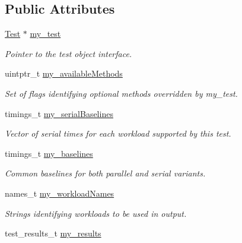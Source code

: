 \subsection*{Public Attributes}
\begin{DoxyCompactItemize}
\item 
\hypertarget{structPerf_1_1internal_1_1TestResults_a8f1159d3b6e5894a402b8e0422ed1144}{}\hyperlink{classPerf_1_1Test}{Test} $\ast$ \hyperlink{structPerf_1_1internal_1_1TestResults_a8f1159d3b6e5894a402b8e0422ed1144}{my\+\_\+test}\label{structPerf_1_1internal_1_1TestResults_a8f1159d3b6e5894a402b8e0422ed1144}

\begin{DoxyCompactList}\small\item\em Pointer to the test object interface. \end{DoxyCompactList}\item 
uintptr\+\_\+t \hyperlink{structPerf_1_1internal_1_1TestResults_a8a6b70b4429aa994c86eb7a78b5ade9d}{my\+\_\+available\+Methods}
\begin{DoxyCompactList}\small\item\em Set of flags identifying optional methods overridden by my\+\_\+test. \end{DoxyCompactList}\item 
timings\+\_\+t \hyperlink{structPerf_1_1internal_1_1TestResults_a32c0056ff414a92af0bf887c7dd47fc4}{my\+\_\+serial\+Baselines}
\begin{DoxyCompactList}\small\item\em Vector of serial times for each workload supported by this test. \end{DoxyCompactList}\item 
timings\+\_\+t \hyperlink{structPerf_1_1internal_1_1TestResults_a7d42b5547c38daedbdf14aa51ce3e2fc}{my\+\_\+baselines}
\begin{DoxyCompactList}\small\item\em Common baselines for both parallel and serial variants. \end{DoxyCompactList}\item 
\hypertarget{structPerf_1_1internal_1_1TestResults_a2d272284bd1c20bbb23e8fb55ee9fad6}{}names\+\_\+t \hyperlink{structPerf_1_1internal_1_1TestResults_a2d272284bd1c20bbb23e8fb55ee9fad6}{my\+\_\+workload\+Names}\label{structPerf_1_1internal_1_1TestResults_a2d272284bd1c20bbb23e8fb55ee9fad6}

\begin{DoxyCompactList}\small\item\em Strings identifying workloads to be used in output. \end{DoxyCompactList}\item 
\hypertarget{structPerf_1_1internal_1_1TestResults_a17a9f028825a7020406f37067c41bc2c}{}test\+\_\+results\+\_\+t \hyperlink{structPerf_1_1internal_1_1TestResults_a17a9f028825a7020406f37067c41bc2c}{my\+\_\+results}\label{structPerf_1_1internal_1_1TestResults_a17a9f028825a7020406f37067c41bc2c}


\end{DoxyCompactItemize}
